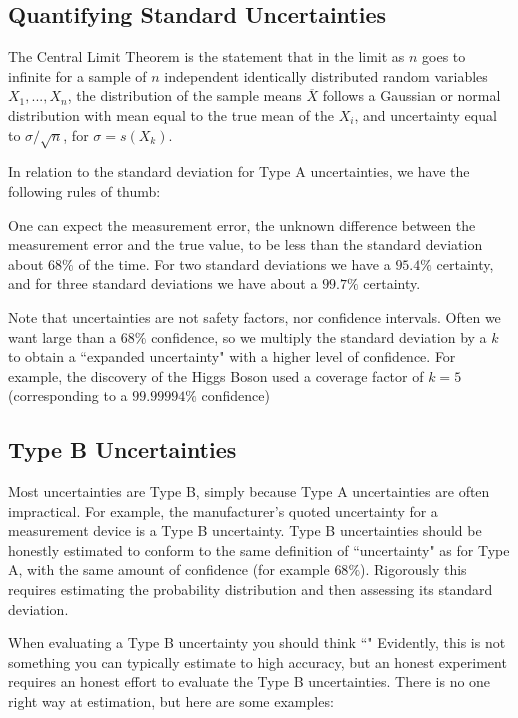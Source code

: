 \documentclass[12pt, a4paper, oneside, openright, titlepage]{book}
\begin{document}
\begin{appendices}
    \subsection{Quantifying Standard Uncertainties}

    The Central Limit Theorem is the statement that in the limit as $n$ goes to infinite for a sample of $n$ independent identically distributed random variables $X_1,...,X_n$, the distribution of the sample means $\overline{X}$ follows a Gaussian or normal distribution with mean equal to the true mean of the $X_i$, and uncertainty equal to $\sigma/\sqrt{n}$, for $\sigma = s(X_k)$. 

    In relation to the standard deviation for Type A uncertainties, we have the following rules of thumb:

    \begin{prop}
        One can expect the measurement error, the unknown difference between the measurement error and the true value, to be less than the standard deviation about $68\%$ of the time. For two standard deviations we have a $95.4\%$ certainty, and for three standard deviations we have about a $99.7\%$ certainty.
    \end{prop}

    Note that uncertainties are not safety factors, nor confidence intervals. Often we want large than a $68\%$ confidence, so we multiply the standard deviation by a  $k$ to obtain a ``expanded uncertainty" with a higher level of confidence. For example, the discovery of the Higgs Boson used a coverage factor of $k = 5$ (corresponding to a $99.99994\%$ confidence)

    \subsection{Type B Uncertainties}

    Most uncertainties are Type B, simply because Type A uncertainties are often impractical. For example, the manufacturer's quoted uncertainty for a measurement device is a Type B uncertainty. Type B uncertainties should be honestly estimated to conform to the same definition of ``uncertainty" as for Type A, with the same amount of confidence (for example $68\%$). Rigorously this requires estimating the probability distribution and then assessing its standard deviation.

    When evaluating a Type B uncertainty you should think ``" Evidently, this is not something you can typically estimate to high accuracy, but an honest experiment requires an honest effort to evaluate the Type B uncertainties.  There is no one right way at estimation, but here are some examples:


\end{appendices}
\end{document}
